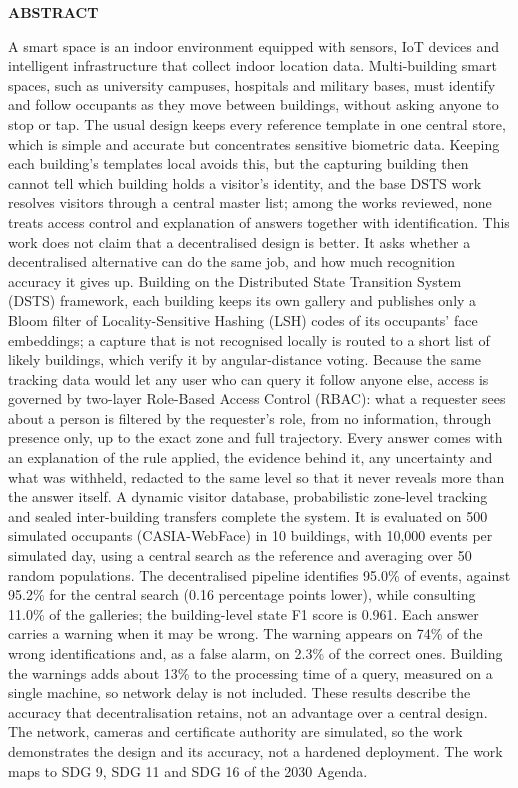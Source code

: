 \documentclass[12pt,a4paper,oneside]{report}
\begin{document}
\clearpage
{}
{}
{\centering \Large\bfseries ABSTRACT\par}
A smart space is an indoor environment equipped with sensors, IoT devices and intelligent infrastructure that collect indoor location data. Multi-building smart spaces, such as university campuses, hospitals and military bases, must identify and follow occupants as they move between buildings, without asking anyone to stop or tap. The usual design keeps every reference template in one central store, which is simple and accurate but concentrates sensitive biometric data. Keeping each building's templates local avoids this, but the capturing building then cannot tell which building holds a visitor's identity, and the base DSTS work resolves visitors through a central master list; among the works reviewed, none treats access control and explanation of answers together with identification. This work does not claim that a decentralised design is better. It asks whether a decentralised alternative can do the same job, and how much recognition accuracy it gives up. Building on the Distributed State Transition System (DSTS) framework, each building keeps its own gallery and publishes only a Bloom filter of Locality-Sensitive Hashing (LSH) codes of its occupants' face embeddings; a capture that is not recognised locally is routed to a short list of likely buildings, which verify it by angular-distance voting. Because the same tracking data would let any user who can query it follow anyone else, access is governed by two-layer Role-Based Access Control (RBAC): what a requester sees about a person is filtered by the requester's role, from no information, through presence only, up to the exact zone and full trajectory. Every answer comes with an explanation of the rule applied, the evidence behind it, any uncertainty and what was withheld, redacted to the same level so that it never reveals more than the answer itself. A dynamic visitor database, probabilistic zone-level tracking and sealed inter-building transfers complete the system. It is evaluated on 500 simulated occupants (CASIA-WebFace) in 10 buildings, with 10,000 events per simulated day, using a central search as the reference and averaging over 50 random populations. The decentralised pipeline identifies 95.0\% of events, against 95.2\% for the central search (0.16 percentage points lower), while consulting 11.0\% of the galleries; the building-level state F1 score is 0.961. Each answer carries a warning when it may be wrong. The warning appears on 74\% of the wrong identifications and, as a false alarm, on 2.3\% of the correct ones. Building the warnings adds about 13\% to the processing time of a query, measured on a single machine, so network delay is not included. These results describe the accuracy that decentralisation retains, not an advantage over a central design. The network, cameras and certificate authority are simulated, so the work demonstrates the design and its accuracy, not a hardened deployment. The work maps to SDG 9, SDG 11 and SDG 16 of the 2030 Agenda.
\end{document}
